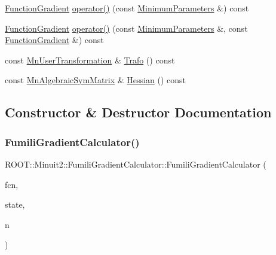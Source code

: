 \begin{DoxyCompactItemize}
\item 
\mbox{\hyperlink{classROOT_1_1Minuit2_1_1FunctionGradient}{Function\+Gradient}} \mbox{\hyperlink{classROOT_1_1Minuit2_1_1FumiliGradientCalculator_a23fd61bceabbf88e66c5abe6b2815331}{operator()}} (const \mbox{\hyperlink{classROOT_1_1Minuit2_1_1MinimumParameters}{Minimum\+Parameters}} \&) const
\item 
\mbox{\hyperlink{classROOT_1_1Minuit2_1_1FunctionGradient}{Function\+Gradient}} \mbox{\hyperlink{classROOT_1_1Minuit2_1_1FumiliGradientCalculator_a652f65091b404ebda9a645d7ba92b3b6}{operator()}} (const \mbox{\hyperlink{classROOT_1_1Minuit2_1_1MinimumParameters}{Minimum\+Parameters}} \&, const \mbox{\hyperlink{classROOT_1_1Minuit2_1_1FunctionGradient}{Function\+Gradient}} \&) const
\item 
const \mbox{\hyperlink{classROOT_1_1Minuit2_1_1MnUserTransformation}{Mn\+User\+Transformation}} \& \mbox{\hyperlink{classROOT_1_1Minuit2_1_1FumiliGradientCalculator_a60672fa936f927ab01a7eb9ede6cb6e0}{Trafo}} () const
\item 
const \mbox{\hyperlink{namespaceROOT_1_1Minuit2_a9e74ad97f5537a2e80e52b04d98ecc6e}{Mn\+Algebraic\+Sym\+Matrix}} \& \mbox{\hyperlink{classROOT_1_1Minuit2_1_1FumiliGradientCalculator_aa6c751b836a8ce27b7335d7d3d6a653f}{Hessian}} () const
\end{DoxyCompactItemize}


\subsection{Constructor \& Destructor Documentation}
\mbox{\label{classROOT_1_1Minuit2_1_1FumiliGradientCalculator_a16d3be3cdef72a0d3cee0bbc683757fc}} 
\subsubsection{\texorpdfstring{FumiliGradientCalculator()}{FumiliGradientCalculator()}\hspace{0.1cm}{\footnotesize\ttfamily [1/2]}}
{\footnotesize\ttfamily R\+O\+O\+T\+::\+Minuit2\+::\+Fumili\+Gradient\+Calculator\+::\+Fumili\+Gradient\+Calculator (\begin{DoxyParamCaption}\item[{const \mbox{\hyperlink{classROOT_1_1Minuit2_1_1FumiliFCNBase}{Fumili\+F\+C\+N\+Base}} \&}]{fcn,  }\item[{const \mbox{\hyperlink{classROOT_1_1Minuit2_1_1MnUserTransformation}{Mn\+User\+Transformation}} \&}]{state,  }\item[{int}]{n }\end{DoxyParamCaption})\hspace{0.3cm}{\ttfamily [inline]}}

